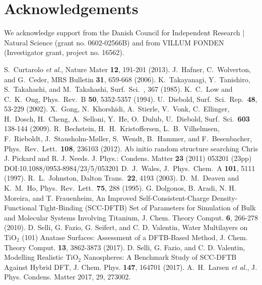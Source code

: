 \documentclass[aip,amsmath,amssymb,reprint]{revtex4-1}
\begin{document}
\section{Acknowledgements}

We acknowledge support from the Danish Council for Independent Research | Natural Science (grant no. 0602-02566B) and from VILLUM FONDEN (Investigator grant, project no. 16562).

\begin{thebibliography}{12}  
 S.\ Curtarolo \textit{et al}., Nature Mater \textbf{12}, 191-201 (2013).
 J.\ Hafner, C.\ Wolverton, and G.\ Ceder, MRS Bulletin \textbf{31}, 659-668 (2006).
K.\ Takayanagi, Y.\ Tanishiro, S.\ Takahashi, and M.\ Takahashi, Surf.\ Sci.\ , 367 (1985).
K.\ C.\ Low and C.\ K.\ Ong, Phys.\ Rev.\ B \textbf{50}, 5352-5357 (1994).
U.\ Diebold, Surf.\ Sci.\ Rep.\ \textbf{48}, 53-229 (2002).
X.\ Gong, N.\ Khorshidi, A.\ Stierle, V.\ Vonk, C.\ Ellinger, H.\ Dosch, H.\ Cheng, A.\ Selloni, Y.\ He, O.\ Dulub, U.\ Diebold, Surf.\ Sci.\ \textbf{603} 138-144 (2009).
R.\ Bechstein, H.\ H.\ Kristoffersen, L.\ B.\ Vilhelmsen, F.\ Rieboldt, J.\ Stausholm-M{\o}ller, S.\ Wendt, B.\ Hammer, and F.\ Besenbacher, Phys.\ Rev.\ Lett.\ \textbf{108}, 236103 (2012).
  {Ab initio random structure searching} Chris J. Pickard and R. J. Needs. J. Phys.: Condens. Matter \textbf{23} (2011) 053201 (23pp) DOI:10.1088/0953-8984/23/5/053201
D.\ J.\ Wales, J.\ Phys.\ Chem.\ A \textbf{101}, 5111 (1997).
R.\ L.\ Johnston, Dalton Trans.\ \textbf{22}, 4193 (2003).
D.\ M.\ Deaven and K.\ M.\ Ho, Phys.\ Rev.\ Lett.\ \textbf{75}, 288 (1995).
G. Dolgonos, B. Aradi, N. H. Moreira, and T. Frauenheim, {An Improved Self-Consistent-Charge Density-Functional Tight-Binding (SCC-DFTB) Set of Parameters for Simulation of Bulk and Molecular Systems Involving Titanium}, J. Chem. Theory Comput. \textbf{6}, 266-278 (2010).
D. Selli, G. Fazio, G. Seifert, and C. D. Valentin, {Water Multilayers on TiO$_2$ (101) Anatase Surfaces: Assessment of a DFTB-Based Method}, J. Chem. Theory Comput. \textbf{13}, 3862-3873 (2017).
D. Selli, G. Fazio, and C. D. Valentin, {Modelling Realistic TiO$_2$ Nanospheres: A Benchmark Study of SCC-DFTB Against Hybrid DFT}, J. Chem. Phys. \textbf{147}, 164701 (2017).
A.\ H.\ Larsen \textit{et al.}, J. Phys. Condens. Matter 2017, 29, 273002.

\end{thebibliography}
\end{document}
